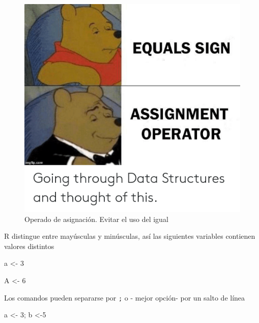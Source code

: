 \documentclass[
]{book}
\newenvironment{Shaded}{\begin{snugshade}}{\end{snugshade}}
\newcommand{\DecValTok}[1]{\textcolor[rgb]{0.00,0.00,0.81}{#1}}
\newcommand{\NormalTok}[1]{#1}
\newcommand{\OtherTok}[1]{\textcolor[rgb]{0.56,0.35,0.01}{#1}}
\begin{document}
\begin{figure}
\centering
\includegraphics{equals-sign-assignment-operator-imgflip-com-going-through-data-structures-and-47188178.png}
\caption{Operado de asignación. Evitar el uso del igual}
\end{figure}

R distingue entre mayúsculas y minúsculas, así las siguientes variables contienen valores distintos

\begin{Shaded}
\begin{Highlighting}[]
\NormalTok{a }\OtherTok{\textless{}{-}} \DecValTok{3}
\end{Highlighting}
\end{Shaded}

\begin{Shaded}
\begin{Highlighting}[]
\NormalTok{A }\OtherTok{\textless{}{-}} \DecValTok{6}
\end{Highlighting}
\end{Shaded}

Los comandos pueden separarse por \texttt{;} o - mejor opción- por un salto de línea

\begin{Shaded}
\begin{Highlighting}[]
\NormalTok{a }\OtherTok{\textless{}{-}} \DecValTok{3}\NormalTok{; b }\OtherTok{\textless{}{-}}\DecValTok{5}
\end{Highlighting}
\end{Shaded}
\end{document}
